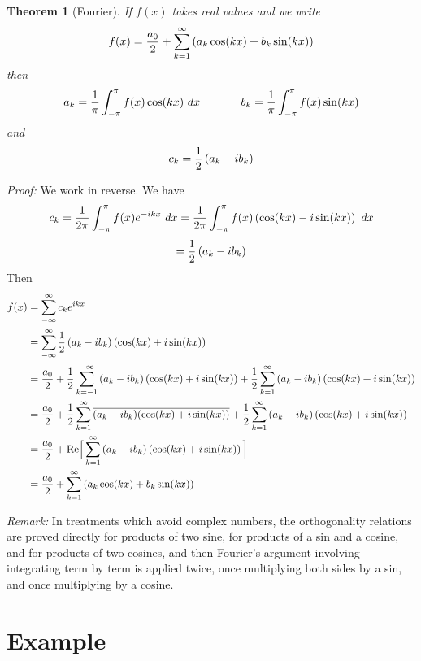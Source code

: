 \documentclass[11pt, oneside]{amsart}
\newtheorem{theorem}{Theorem}
\def\Re{\mbox{Re}}
\begin{document}
\newpage

 \begin{theorem}[Fourier]
 If $f(x)$ takes real values and we write
 $$f(x) = {{a_0} \over 2} + \sum_{k = 1}^\infty \left( a_k \cos(kx) + b_k \sin(kx) \right)$$
 then
$$a_k = {1 \over \pi} \int_{- \pi}^\pi f(x) \cos(kx) \ dx \hspace{.5in}  b_k = {1 \over \pi} \int_{- \pi}^\pi f(x) \sin(kx)$$
and
$$c_k = {1 \over 2} \left( a_k - i b_k \right)$$
 \end{theorem}
 
 {\em Proof:} We work in reverse. We have
 $$c_k  = {1 \over {2 \pi}} \int_{- \pi}^\pi f(x) e^{- ikx} \ dx =  {1 \over {2 \pi}} \int_{- \pi}^\pi f(x) \left( \cos(kx) - i \sin(kx) \right) \ dx$$
 $$ = {1 \over 2} \left( a_k - i b_k \right)$$ 
 Then
 \begin{align*}
 f(x) &= \sum_{- \infty}^\infty c_k e^{ikx} \\
 &= \sum_{- \infty}^\infty {1 \over 2} \left( a_k - i b_k \right) \left( \cos (kx) + i \sin(kx) \right) \\
 &= {{a_0} \over 2} + {1 \over 2}  \sum_{k = -1}^{-\infty} \left( a_k - i b_k \right) \left( \cos (kx) + i \sin(kx) \right) +  {1 \over 2} \sum_{k = 1}^\infty \left( a_k - i b_k \right) \left( \cos (kx) + i \sin(kx) \right) \\
 &= {{a_0} \over 2} + {1 \over 2}  \sum_{k = 1}^{\infty} \overline{\left( a_k - i b_k \right)} \overline{ \left( \cos (kx) + i \sin(kx) \right) }+ {1 \over 2} \sum_{k = 1}^\infty \left( a_k - i b_k \right) \left( \cos (kx) + i \sin(kx) \right)\\ 
 &= {{a_0} \over 2} + \Re \Big[  \sum_{k = 1}^\infty \left( a_k - i b_k \right) \left( \cos (kx) + i \sin(kx) \right) \Big] \\
 &= {{a_0} \over 2} + \sum_{k = 1}^\infty \left( a_k \cos(kx) + b_k \sin(kx) \right)
 \end{align*}
 
 {\em Remark:} In treatments which avoid complex numbers, the orthogonality relations are proved directly for products of two sine, for products of a sin and a cosine, and for products of two cosines, and then Fourier's argument involving integrating term by term is applied twice, once multiplying both sides by a sin, and once multiplying by a cosine.
 
\section{Example}
\end{document}
